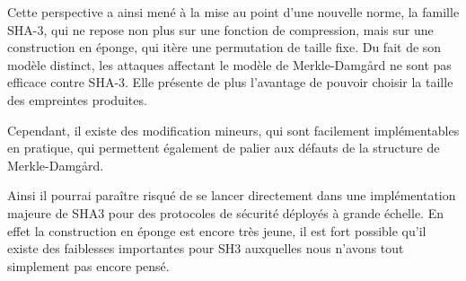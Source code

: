 \documentclass[10.5pt, a4paper, twoside, openright]{report}
\begin{document}
Cette perspective a ainsi mené à la mise au point d'une nouvelle norme, la famille SHA-3, qui ne repose non plus sur une fonction de compression, mais sur une construction en éponge, qui itère une permutation de taille fixe. Du fait de son modèle distinct, les attaques affectant le modèle de Merkle-Damg\r{a}rd ne sont pas efficace contre SHA-3. Elle présente de plus l'avantage de pouvoir choisir la taille des empreintes produites. 

Cependant, il existe des modification mineurs, qui sont facilement implémentables en pratique, qui permettent également de palier aux défauts de la structure de Merkle-Damg\r{a}rd.

Ainsi il pourrai paraître risqué de se lancer directement dans une implémentation majeure de SHA3 pour des protocoles de sécurité déployés à grande échelle.
En effet la construction en éponge est encore très jeune, il est fort possible qu'il existe des faiblesses importantes pour SH3 auxquelles nous n'avons tout simplement pas encore pensé.
\end{document}
